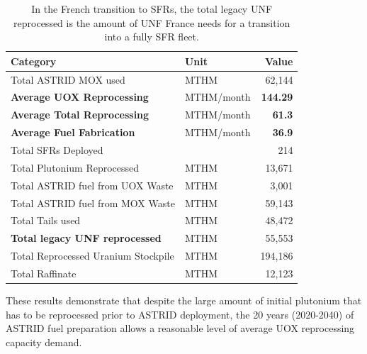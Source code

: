 \begin{table}[h]
    \centering
    \caption {In the French transition to \glspl{SFR},
                  the total legacy \gls{UNF} reprocessed is the 
                                  amount of \gls{UNF} France needs 
                  for a transition into a fully \gls{SFR} fleet. 
                          }
        \begin{tabular}{llr}
            \hline
            \textbf{Category} & \textbf{Unit} & \textbf{Value}  \\ \hline
            Total \gls{ASTRID} MOX used & MTHM & 62,144  \\ 
            \textbf{Average UOX Reprocessing} & MTHM/month & \textbf{144.29} \\
            \textbf{Average Total Reprocessing} & MTHM/month & \textbf{61.3} \\
            \textbf{Average Fuel Fabrication} & MTHM/month & \textbf{36.9} \\
            Total \glspl{SFR} Deployed & & 214 \\ 
            Total Plutonium Reprocessed & MTHM & 13,671 \\ 
            Total \gls{ASTRID} fuel from UOX Waste & MTHM & 3,001  \\ 
            Total \gls{ASTRID} fuel from MOX Waste & MTHM  & 59,143 \\ 
            Total Tails used & MTHM & 48,472 \\ 
            \textbf{Total legacy UNF reprocessed} & MTHM & 55,553 \\ 
            Total Reprocessed Uranium Stockpile & MTHM & 194,186 \\ 
            Total Raffinate & MTHM & 12,123 \\ \hline
        \end{tabular}
        
        \label{tab:sfr_sim_result}
\end {table}

\FloatBarrier

These results demonstrate that despite the large amount of initial plutonium that has to be reprocessed
prior to \gls{ASTRID} deployment, the 20 years (2020-2040) of 
\gls{ASTRID} fuel preparation
allows a reasonable level of average
\gls{UOX} reprocessing capacity demand.

